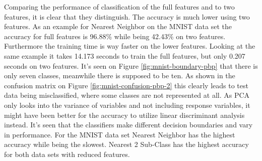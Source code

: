 Comparing the performance of classification of the full features and to two features, it is clear that they distinguish. The accuracy is much lower using two features. As an example for Nearest Neighbor on the MNIST data set the accuracy for full features is 96.88\% while being 42.43\% on two features. Furthermore the training time is way faster on the lower features. Looking at the same example it takes 14.173 seconds to train the full features, but only 0.207 seconds on two features. It's seen on Figure \ref{fig:mnist-boundary-pbp} that there is only seven classes, meanwhile there is supposed to be ten. As shown in the confusion matrix on Figure \ref{fig:mnist-confusion-pbp-2} this clearly leads to test data being misclassified, where some classes are not represented at all. As PCA only looks into the variance of variables and not including response variables, it might have been better for the accuracy to utilize linear discriminant analysis instead. It's seen that the classifiers make different decision boundaries and vary in performance. For the MNIST data set Nearest Neighbor has the highest accuracy while being the slowest. Nearest 2 Sub-Class has the highest accuracy for both data sets with reduced features.           